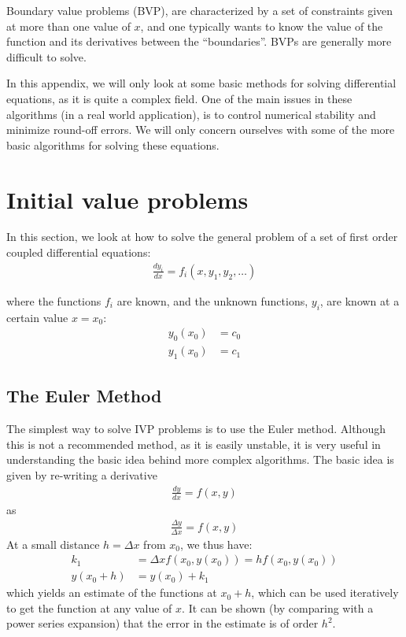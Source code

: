 Boundary value problems (BVP), are characterized by a set of constraints given at more than one value of $x$, and one typically wants to know the value of the function and its derivatives between the ``boundaries''. BVPs are generally more difficult to solve. 

In this appendix, we will only look at some basic methods for solving differential equations, as it is quite a complex field. One of the main issues in these algorithms (in a real world application), is to control numerical stability and minimize round-off errors. We will only concern ourselves with some of the more basic algorithms for solving these equations.

\section{Initial value problems}
In this section, we look at how to solve the general problem of a set of first order coupled differential equations:
\begin{align}
\frac{dy_i}{dx} = f_i(x, y_1,y_2,\ldots )
\end{align}

where the functions $f_i$ are known, and the unknown functions, $y_i$, are known at a certain value $x=x_0$:
\begin{align}
 y_0(x_0) &= c_0 \nonumber\\
 y_1(x_0) &= c_1
\end{align}
 

\subsection{The Euler Method}

The simplest way to solve IVP problems is to use the Euler method. Although this is not a recommended method, as it is easily unstable, it is very useful in understanding the basic idea behind more complex algorithms. The basic idea is given by re-writing a derivative
\begin{align}
 \frac{dy}{dx} = f(x,y) 
\end{align}
as
\begin{align}
\frac{\Delta y}{\Delta x } = f(x,y)
\end{align}
At a small distance $h=\Delta x$ from $x_0$, we thus have:
\begin{align}
 k_1&=\Delta xf(x_0,y(x_0))=hf(x_0,y(x_0)) \nonumber\\
 y(x_0+h) &= y(x_0) + k_1 
\end{align}
which yields an estimate of the functions at $x_0+h$, which can be used iteratively to get the function at any value of $x$. It can be shown (by comparing with a power series expansion) that the error in the estimate is of order $h^2$.

